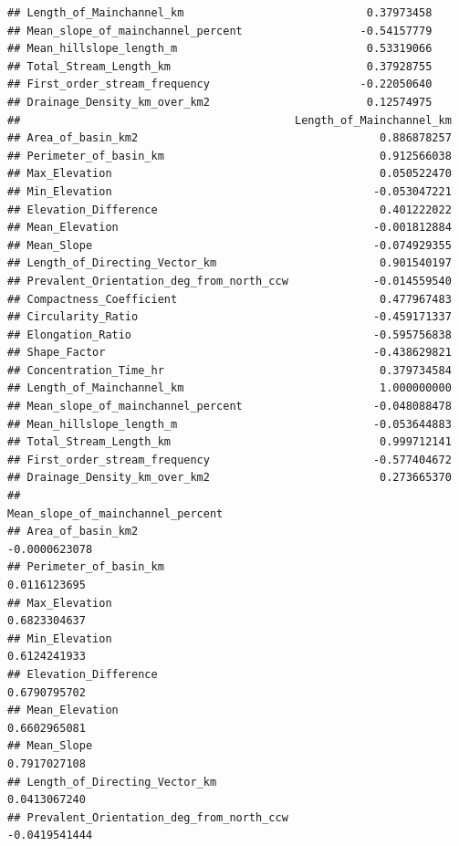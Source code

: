 \documentclass[11pt,]{article}
\begin{document}
\begin{verbatim}
## Length_of_Mainchannel_km                            0.37973458
## Mean_slope_of_mainchannel_percent                  -0.54157779
## Mean_hillslope_length_m                             0.53319066
## Total_Stream_Length_km                              0.37928755
## First_order_stream_frequency                       -0.22050640
## Drainage_Density_km_over_km2                        0.12574975
##                                          Length_of_Mainchannel_km
## Area_of_basin_km2                                     0.886878257
## Perimeter_of_basin_km                                 0.912566038
## Max_Elevation                                         0.050522470
## Min_Elevation                                        -0.053047221
## Elevation_Difference                                  0.401222022
## Mean_Elevation                                       -0.001812884
## Mean_Slope                                           -0.074929355
## Length_of_Directing_Vector_km                         0.901540197
## Prevalent_Orientation_deg_from_north_ccw             -0.014559540
## Compactness_Coefficient                               0.477967483
## Circularity_Ratio                                    -0.459171337
## Elongation_Ratio                                     -0.595756838
## Shape_Factor                                         -0.438629821
## Concentration_Time_hr                                 0.379734584
## Length_of_Mainchannel_km                              1.000000000
## Mean_slope_of_mainchannel_percent                    -0.048088478
## Mean_hillslope_length_m                              -0.053644883
## Total_Stream_Length_km                                0.999712141
## First_order_stream_frequency                         -0.577404672
## Drainage_Density_km_over_km2                          0.273665370
##                                          Mean_slope_of_mainchannel_percent
## Area_of_basin_km2                                            -0.0000623078
## Perimeter_of_basin_km                                         0.0116123695
## Max_Elevation                                                 0.6823304637
## Min_Elevation                                                 0.6124241933
## Elevation_Difference                                          0.6790795702
## Mean_Elevation                                                0.6602965081
## Mean_Slope                                                    0.7917027108
## Length_of_Directing_Vector_km                                 0.0413067240
## Prevalent_Orientation_deg_from_north_ccw                     -0.0419541444

\end{verbatim}
\end{document}
